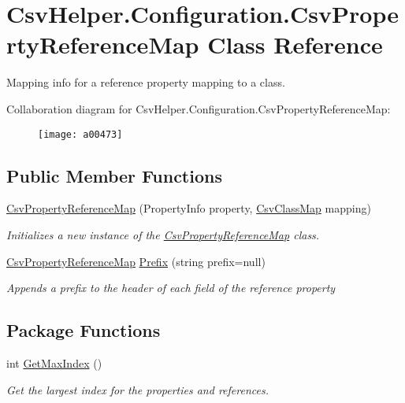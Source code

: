 \hypertarget{a00072}{\section{Csv\-Helper.\-Configuration.\-Csv\-Property\-Reference\-Map Class Reference}
\label{a00072}
}


Mapping info for a reference property mapping to a class.  




Collaboration diagram for Csv\-Helper.\-Configuration.\-Csv\-Property\-Reference\-Map\-:
\nopagebreak
\begin{figure}[H]
\begin{center}
\leavevmode
\texttt{[image: a00473]}
\end{center}
\end{figure}
\subsection*{Public Member Functions}
\begin{DoxyCompactItemize}
\item 
\hyperlink{a00072_a02823d2439667bca75233abbe81651ff}{Csv\-Property\-Reference\-Map} (Property\-Info property, \hyperlink{a00057}{Csv\-Class\-Map} mapping)
\begin{DoxyCompactList}\small\item\em Initializes a new instance of the \hyperlink{a00072}{Csv\-Property\-Reference\-Map} class. \end{DoxyCompactList}\item 
\hyperlink{a00072}{Csv\-Property\-Reference\-Map} \hyperlink{a00072_a0ed653de99ec2251fd99837740693789}{Prefix} (string prefix=null)
\begin{DoxyCompactList}\small\item\em Appends a prefix to the header of each field of the reference property \end{DoxyCompactList}\end{DoxyCompactItemize}
\subsection*{Package Functions}
\begin{DoxyCompactItemize}
\item 
int \hyperlink{a00072_a1e879f9a6ed84415ac52c44f1f086606}{Get\-Max\-Index} ()
\begin{DoxyCompactList}\small\item\em Get the largest index for the properties and references. \end{DoxyCompactList}\end{DoxyCompactItemize}
